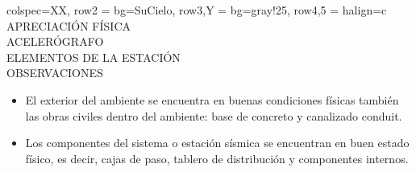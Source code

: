 \begin{tblr}{
        colspec={XX},
        row{2} = {bg=SuCielo},
        row{3,Y} = {bg=gray!25},
        row{4,5} = {halign=c}
    }
     APRECIACIÓN FÍSICA \\
     ACELERÓGRAFO \MakeUppercase{} \\
     ELEMENTOS DE LA ESTACIÓN \\
     OBSERVACIONES \\
     \begin{itemize}
        \item El exterior del ambiente se encuentra en buenas condiciones físicas también las obras civiles dentro del ambiente: base de concreto y canalizado conduit.
        \item Los componentes del sistema o estación sísmica se encuentran en buen estado físico, es decir, cajas de paso, tablero de distribución y componentes internos.
    \end{itemize}
\end{tblr}
